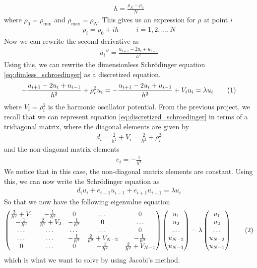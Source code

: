 \documentclass{article}
\newcommand\numberthis{\addtocounter{equation}{1}\tag{\theequation}}
\newcommand\ppmat[1]{\begin{pmatrix}#1\end{pmatrix}}
\begin{document}
\begin{align*}
  h = \frac{\rho_N-\rho_0}{N}
\end{align*}
where $\rho_0 = \rho_{\text{min}}$ and $\rho_{\text{max}} =\rho_N$. This gives us an expression for $\rho$ at point $i$
\begin{align*}
  \rho_i = \rho_0 + ih\;\;\;\;\;\;\;\;\;i=1,2,\dots,N
\end{align*}
Now we can rewrite the second derivative as
\begin{align*}
  u_i'' = \frac{u_{i+1}-2u_i + u_{i-1}}{h^2}
\end{align*}
Using this, we can rewrite the dimensionless Schrödinger equation \eqref{eq:dimless_schroedinger} as a discretized equation.
\begin{align*}
  -\frac{u_{i+1}-2u_i+u_{i-1}}{h^2} + \rho_i^2u_i = -\frac{u_{i+1}-2u_i+u_{i-1}}{h^2} + V_iu_i = \lambda u_i \numberthis\label{eq:discretized_schroedinger}
\end{align*}
where $V_i = \rho_i^2$ is the harmonic oscillator potential. From the previous project, we recall that we can represent equation \eqref{eq:discretized_schroedinger} in terms of a tridiagonal matrix, where the diagonal elements are given by
\begin{align*}
  d_i = \frac{2}{h^2} + V_i = \frac{2}{h^2} + \rho_i^2
\end{align*}
and the non-diagonal matrix elements
\begin{align*}
  e_i = -\frac{1}{h^2}
\end{align*}
We notice that in this case, the non-diagonal matrix elements are constant. Using this, we can now write the Schrödinger equation as
\begin{align*}
  d_iu_i + e_{i-1}u_{i-1} + e_{i+1}u_{i+1} = \lambda u_i
\end{align*}
So that we now have the following eigenvalue equation
\begin{align*}
\ppmat{\frac{2}{h^2}+V_1&-\frac{1}{h^2}&0&\dots&0\\
    -\frac{1}{h^2}&\frac{2}{h^2}+V_2&-\frac{1}{h^2}&0&\dots\\
    \dots&\dots&\dots&\dots&0\\
    \dots&\dots&-\frac{1}{h^2}&\frac{2}{h^2}+V_{N-2}&-\frac{1}{h^2}\\
    0&\dots&0&-\frac{1}{h^2}&\frac{2}{h^2}+V_{N-1}}
  \ppmat{u_1\\u_2\\\dots\\u_{N-2}\\u_{N-1}} = \lambda
  \ppmat{u_1\\u_2\\\dots\\u_{N-2}\\u_{N-1}} \numberthis\label{eq:eigval_eq}
\end{align*}
which is what we want to solve by using Jacobi's method.
\end{document}
